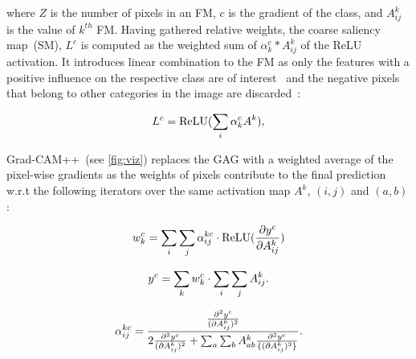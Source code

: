 \documentclass[conference]{IEEEtran}
\begin{document}
where $Z$ is the number of pixels in an FM, $c$ is the gradient of the class, and $A_{ij}^k$ is the value of $k^{th}$ FM. Having gathered relative weights, the coarse saliency map~(SM), $L^c$ is computed as the weighted sum of $\alpha_k^c*A_{ij}^k$ of the ReLU activation.
It introduces linear combination to the FM as only the features with a positive influence on the respective class are of interest~\cite{chattopadhay2018grad} and the negative pixels that belong to other categories in the image are discarded~\cite{114}:

\vspace{-2mm}
\begin{equation}
\scriptsize{
    L^c=\operatorname{ReLU}(\sum_{i}\alpha_k^cA^k),}
    \label{3.11}
\end{equation}
\vspace{-4mm}

Grad-CAM++~(see \cref{fig:viz}) replaces the GAG with a weighted average of the pixel-wise gradients as the weights of pixels contribute to the final prediction w.r.t the following iterators over the same activation map $A^k$, $(i,j)$ and $(a,b)$: 

\vspace{-2mm}
\begin{equation}
\scriptsize{
    w_k^c=\sum_{i}\sum_{j}\alpha_{ij}^{kc}\cdot \operatorname{ReLU}(\frac{\partial y^c}{\partial A_{ij}^k})}
\end{equation}
\vspace{-2mm}

\begin{equation}
\scriptsize{
    y^c=\sum_{k}w_k^c\cdot \sum_{i}\sum_{j}A_{ij}^k.} 
\end{equation}
\vspace{-4mm}

\begin{equation}
\scriptsize{
    \alpha_{ij}^{kc}=\frac{\frac{\partial^2y^c}{(\partial A_{ij}^k)^2}}{2\frac{\partial^2y^c}{(\partial A_{ij}^k)^2}+\sum_{a}\sum_{b}A_{ab}^k{\frac{\partial^3y^c}{\{(\partial A_{ij}^k)^3\}}}}.}
    \label{eq:w}
\end{equation}
\vspace{-2mm}
\end{document}
